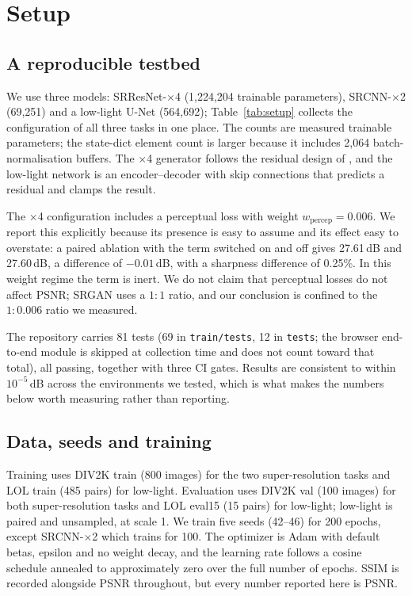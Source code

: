 \documentclass[10pt,twocolumn]{article}
\begin{document}
\section{Setup}

\subsection{A reproducible testbed}

We use three models: SRResNet-$\times$4 (1,224,204 trainable parameters),
SRCNN-$\times$2 (69,251) and a low-light U-Net (564,692); Table~\ref{tab:setup}
collects the configuration of all three tasks in one place. The counts are
measured trainable parameters; the state-dict element count is larger
because it includes 2,064 batch-normalisation buffers. The $\times$4
generator follows the residual design of \cite{he2016resnet}, and the
low-light network is an encoder--decoder with skip connections that
predicts a residual and clamps the result.

The $\times$4 configuration includes a perceptual loss with weight
$w_{\mathrm{percep}}=0.006$. We report this explicitly because its presence
is easy to assume and its effect easy to overstate: a paired ablation with
the term switched on and off gives 27.61\,dB and 27.60\,dB, a difference
of $-0.01$\,dB, with a sharpness difference of 0.25\%. In this weight
regime the term is inert. We do not claim that perceptual losses do not
affect PSNR; SRGAN uses a $1{:}1$ ratio, and our conclusion is confined to
the $1{:}0.006$ ratio we measured.



The repository carries 81 tests (69 in \texttt{train/tests}, 12 in
\texttt{tests}; the browser end-to-end module is skipped at collection time
and does not count toward that total), all passing, together with three CI
gates. Results are consistent to within $10^{-5}$\,dB across the
environments we tested, which is what makes the numbers below worth
measuring rather than reporting.

\subsection{Data, seeds and training}

Training uses DIV2K train (800 images) \cite{agustsson2017ntire} for the
two super-resolution tasks and LOL train (485 pairs) \cite{wei2018retinex}
for low-light. Evaluation uses DIV2K val (100 images) for both
super-resolution tasks and LOL eval15 (15 pairs) for low-light; low-light is
paired and unsampled, at scale 1. We train five seeds (42--46) for 200
epochs, except SRCNN-$\times$2 which trains for 100. The optimizer is Adam
\cite{kingma2015adam} with default betas, epsilon and no weight decay, and
the learning rate follows a cosine schedule annealed to approximately zero
over the full number of epochs. SSIM \cite{wang2004ssim} is recorded
alongside PSNR throughout, but every number reported here is PSNR.
\end{document}
